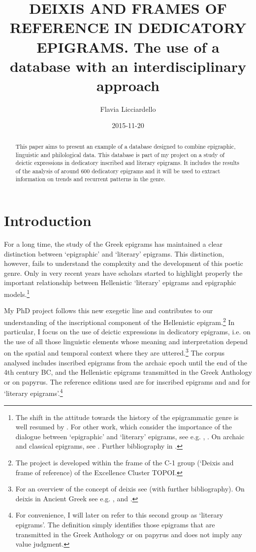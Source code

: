 \documentclass[amsthm,ebook]{saparticle}
\title{DEIXIS AND FRAMES OF REFERENCE IN DEDICATORY EPIGRAMS. The use of a database with an interdisciplinary approach}
\author[topoi]{Flavia Licciardello\corref{first}}
\date{2015-11-20}
\begin{document}
\maketitle
\begin{abstract}
This paper aims to present an example of a database designed to combine epigraphic, linguistic and
philological data. This database is part of my project on a study of deictic expressions in dedicatory inscribed and
literary epigrams. It includes the results of the analysis of around 600 dedicatory epigrams and it will be used to
extract information on trends and recurrent patterns in the genre.
\end{abstract}

\section{Introduction}


\noindent For a long time, the study of the Greek epigrams has maintained a clear distinction between `epigraphic' and `literary'
epigrams. This distinction, however, fails to understand the complexity and the development of this poetic genre. Only
in very recent years have scholars started to highlight properly the important relationship between Hellenistic
`literary' epigrams and epigraphic models.\footnote{ The shift in the attitude towards the history of the epigrammatic
genre is well resumed by \citep[5-34]{garulli_byblos_2012}. For other work, which consider the importance of the dialogue between
`epigraphic' and `literary' epigrams, see e.g. \citep{meyer_inszeniertes_2005}, \citep{tueller_look_2008}. On archaic and classical epigrams, see
\citep{baumbach_archaic_2010}. Further bibliography in \citep[2]{baumbach_archaic_2010}.} 

My PhD project follows this new exegetic line and contributes to our understanding of the inscriptional component of the
Hellenistic epigram.\footnote{ The project is developed within the frame of the C-1 group (`Deixis and frame of
reference) of the Excellence Cluster TOPOI.} In particular, I focus on the use of deictic expressions in dedicatory
epigrams, i.e. on the use of all those linguistic elements whose meaning and interpretation depend on the spatial and
temporal context where they are uttered.\footnote{ For an overview of the concept of deixis see \citep{diessel_deixis_2012} (with
further bibliography). On deixis in Ancient Greek see e.g. \citep{felson_poetics_2004}, \citep{edmunds_deixis_2008} and \citep{bonifazi_deixis_2014}.} The
corpus analysed includes inscribed epigrams from the archaic epoch until the end of the 4th century BC, and the
Hellenistic epigrams transmitted in the Greek Anthology or on papyrus. The reference editions used are \citep[1-2]{hansen_carmina_1983}
for inscribed epigrams and \citep{gow_greek_1965} and \citep{austin_posidippi_2002} for `literary epigrams'.\footnote{ For
convenience, I will later on refer to this second group as `literary epigrams'. The definition simply identifies those
epigrams that are transmitted in the Greek Anthology or on papyrus and does not imply any value judgment.} 
\end{document}
